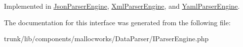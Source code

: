 Implemented in \hyperlink{class_utopia_1_1_components_1_1_data_parser_1_1_json_parser_engine_a0e48ec53c3dc0fdc3918ca54041744e7}{JsonParserEngine}, \hyperlink{class_utopia_1_1_components_1_1_data_parser_1_1_xml_parser_engine_a0e48ec53c3dc0fdc3918ca54041744e7}{XmlParserEngine}, and \hyperlink{class_utopia_1_1_components_1_1_data_parser_1_1_yaml_parser_engine_a0e48ec53c3dc0fdc3918ca54041744e7}{YamlParserEngine}.



The documentation for this interface was generated from the following file:\begin{DoxyCompactItemize}
\item 
trunk/lib/components/mallocworks/DataParser/IParserEngine.php\end{DoxyCompactItemize}
